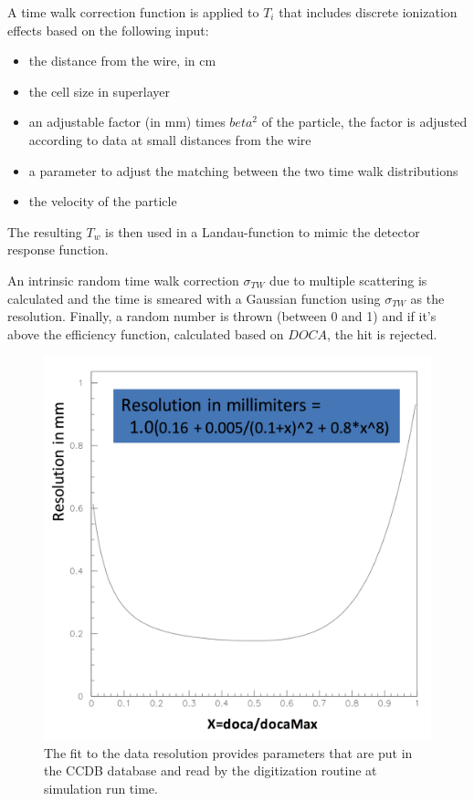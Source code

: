 A time walk correction function is applied to $T_i$ that includes discrete ionization effects based on the following input:

\begin{itemize}
	\item the distance from the wire, in cm
	\item the cell size in superlayer
	\item an adjustable factor (in mm) times $beta^2$ of the particle, the factor is adjusted according to data at small distances from the wire
	\item a parameter to adjust the matching between the two time walk distributions
	\item the velocity of the particle
\end{itemize}

The resulting $T_w$ is then used in a Landau-function to mimic the detector response function.

An intrinsic random time walk correction $\sigma_{TW}$ due to multiple scattering is calculated and the time is smeared with
a Gaussian function using $\sigma_{TW}$ as the resolution.
Finally, a random number is thrown (between 0 and 1) and if it's above the efficiency function, calculated based on $DOCA$, the hit is rejected.

\begin{figure}
	\centering
	\includegraphics[width=0.95\columnwidth,keepaspectratio]{img/dcResolution.png}
	\caption{The fit to the data resolution provides parameters that are put in the CCDB database and read by the digitization routine at simulation run time.}
	\label{fig:dcResolution}
\end{figure}


